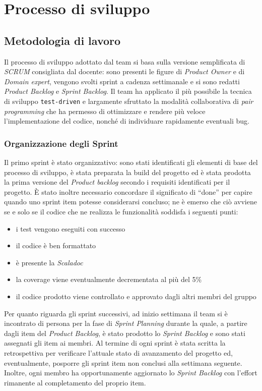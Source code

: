 \chapter{Processo di sviluppo}\label{ch:processo-di-sviluppo}
\section{Metodologia di lavoro}\label{sec:metodologia-di-lavoro}
Il processo di sviluppo adottato dal team si basa sulla versione semplificata di \textit{SCRUM} consigliata dal docente:
sono presenti le figure di \textit{Product Owner} e di \textit{Domain expert}, vengono svolti sprint a cadenza
settimanale e si sono redatti \textit{Product Backlog} e \textit{Sprint Backlog}.
Il team ha applicato il più possibile la tecnica di sviluppo \texttt{test-driven} e largamente sfruttato la modalità
collaborativa di \textit{pair programming} che ha permesso di ottimizzare e rendere più veloce l'implementazione del
codice, nonché di individuare rapidamente eventuali bug.

\subsection{Organizzazione degli Sprint}\label{subsec:organizzazione-sprint}
Il primo sprint è stato organizzativo: sono stati identificati gli elementi di base del processo di sviluppo, è stata
preparata la build del progetto ed è stata prodotta la prima versione del \textit{Product backlog} secondo i requisiti
identificati per il progetto.
È stato inoltre necessario concordare il significato di ``done'' per capire quando uno sprint item potesse considerarsi
concluso;
ne è emerso che ciò avviene se e solo se il codice che ne realizza le funzionalità soddisfa i seguenti punti:
\begin{itemize}
    \item i test vengono eseguiti con successo
    \item il codice è ben formattato
    \item è presente la \textit{Scaladoc}
    \item la coverage viene eventualmente decrementata al più del 5\%
    \item il codice prodotto viene controllato e approvato dagli altri membri del gruppo
\end{itemize}
Per quanto riguarda gli sprint successivi, ad inizio settimana il team si è incontrato di persona per la fase di
\textit{Sprint Planning} durante la quale, a partire dagli item del \textit{Product Backlog}, è stato prodotto lo
\textit{Sprint Backlog} e sono stati assegnati gli item ai membri.
Al termine di ogni sprint è stata scritta la retrospettiva per verificare l'attuale stato di avanzamento del progetto
ed, eventualmente, posporre gli sprint item non conclusi alla settimana seguente.
Inoltre, ogni membro ha opportunamente aggiornato lo \textit{Sprint Backlog} con l'effort rimanente al completamento del
proprio item.

